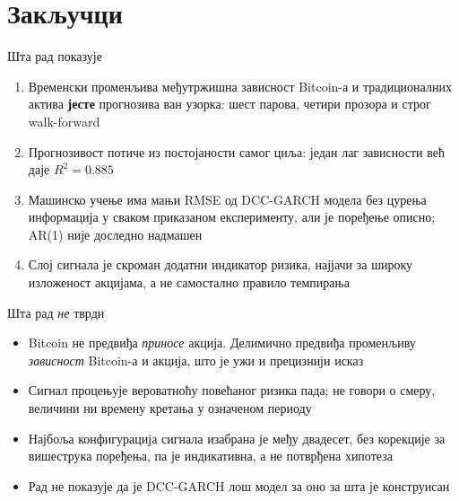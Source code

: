 \documentclass[aspectratio=169]{beamer}
\begin{document}
\section{Закључци}

\begin{frame}{Шта рад показује}
    \begin{enumerate}
        \item Временски променљива међутржишна зависност Bitcoin-а и традиционалних актива \textbf{јесте} прогнозива ван узорка: шест парова, четири прозора и строг walk-forward
        \item Прогнозивост потиче из постојаности самог циља: један лаг зависности већ даје $R^2 = 0.885$
        \item Машинско учење има мањи RMSE од DCC-GARCH модела без цурења информација у сваком приказаном експерименту, али је поређење описно; AR(1) није доследно надмашен
        \item Слој сигнала је скроман додатни индикатор ризика, најјачи за широку изложеност акцијама, а не самостално правило темпирања
    \end{enumerate}
\end{frame}

\begin{frame}{Шта рад \emph{не} тврди}
    \begin{itemize}
        \item Bitcoin не предвиђа \emph{приносе} акција. Делимично предвиђа променљиву \emph{зависност} Bitcoin-а и акција, што је ужи и прецизнији исказ
        \item Сигнал процењује вероватноћу повећаног ризика пада; не говори о смеру, величини ни времену кретања у означеном периоду
        \item Најбоља конфигурација сигнала изабрана је међу двадесет, без корекције за вишеструка поређења, па је индикативна, а не потврђена хипотеза
        \item Рад не показује да је DCC-GARCH лош модел за оно за шта је конструисан
    \end{itemize}
\end{frame}
\end{document}
